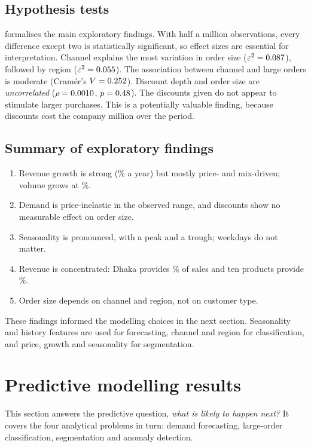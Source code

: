 \subsection{Hypothesis tests}
 formalises the main exploratory findings. With half a million observations, every difference
except two is statistically significant, so effect sizes are essential for interpretation. Channel explains the
most variation in order size ($\varepsilon^2=0.087$), followed by region ($\varepsilon^2=0.055$).
The association between channel and large orders is moderate (Cram\'er's $V=0.252$). Discount depth and
order size are \emph{uncorrelated} ($\rho=0.0010$, $p=0.48$). The discounts given do not appear to
stimulate larger purchases. This is a potentially valuable finding, because discounts cost the company
\BDT\DiscountCost million over the period.



\subsection{Summary of exploratory findings}
\begin{enumerate}
  \item Revenue growth is strong (\CAGRSales\% a year) but mostly price- and mix-driven; volume grows at \CAGRUnits\%.
  \item Demand is price-inelastic in the observed range, and discounts show no measurable effect on order size.
  \item Seasonality is pronounced, with a \PeakMonth peak and a \TroughMonth trough; weekdays do not matter.
  \item Revenue is concentrated: Dhaka provides \DhakaShare\% of sales and ten products provide \TopTenShare\%.
  \item Order size depends on channel and region, not on customer type.
\end{enumerate}
These findings informed the modelling choices in the next section. Seasonality and history features are used
for forecasting, channel and region for classification, and price, growth and seasonality for segmentation.
\section{Predictive modelling results}\label{ch:models}

This section answers the predictive question, \emph{what is likely to happen next?} It covers the four
analytical problems in turn: demand forecasting, large-order classification, segmentation and anomaly detection.

